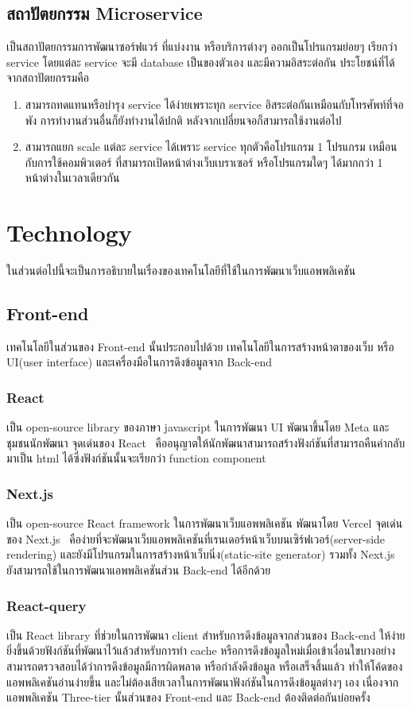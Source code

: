 \subsection{สถาปัตยกรรม Microservice}
เป็นสถาปัตยกรรมการพัฒนาซอร์ฟแวร์ ที่แบ่งงาน หรือบริการต่างๆ ออกเป็นโปรแกรมย่อยๆ
เรียกว่า service โดยแต่ละ service จะมี database เป็นของตัวเอง และมีความอิสระต่อกัน 
ประโยชน์ที่ได้จากสถาปัตยกรรมคือ 
\begin{enumerate}
      \item สามารถทดแทนหรือบำรุง service ได้ง่ายเพราะทุก service อิสระต่อกันเหมือนกับโทรศัพท์ที่จอพัง 
      การทำงานส่วนอื่นก็ยังทำงานได้ปกติ หลังจากเปลี่ยนจอก็สามารถใช้งานต่อไป
      \item สามารถแยก scale แต่ละ service ได้เพราะ service ทุกตัวคือโปรแกรม 1 โปรแกรม เหมือนกับการใช้คอมพิวเตอร์
      ที่สามารถเปิดหน้าต่างเว็บเบราเซอร์ หรือโปรแกรมใดๆ ได้มากกว่า 1 หน้าต่างในเวลาเดียวกัน
\end{enumerate}

\section{Technology}
ในส่วนต่อไปนี้จะเป็นการอธิบายในเรื่องของเทคโนโลยีที่ใช้ในการพัฒนาเว็บแอพพลิเคชัน
\subsection{Front-end}
เทคโนโลยีในส่วนของ Front-end นั้นประกอบไปด้วย
เทคโนโลยีในการสร้างหน้าตาของเว็บ หรือ UI(user interface)
และเครื่องมือในการดึงข้อมูลจาก Back-end
\subsubsection{React}
เป็น open-source library ของภาษา javascript ในการพัฒนา UI พัฒนาขึ้นโดย Meta และชุมชนนักพัฒนา
จุดเด่นของ React~\cite{react-wiki} คืออนุญาตให้นักพัฒนาสามารถสร้างฟังก์ชันที่สามารถคืนค่ากลับมาเป็น html ได้ซึ่งฟังก์ชันนั้นจะเรียกว่า function component
\subsubsection{Next.js}
เป็น open-source React framework ในการพัฒนาเว็บแอพพลิเคชัน พัฒนาโดย Vercel
จุดเด่นของ Next.js~\cite{next-wiki} คือง่ายที่จะพัฒนาเว็บแอพพลิเคชันที่เรนเดอร์หน้าเว็บบนเซิร์ฟเวอร์(server-side rendering) และยังมีโปรแกรมในการสร้างหน้าเว็บนิ่ง(static-site generator)
รวมทั้ง Next.js ยังสามารถใช้ในการพัฒนาแอพพลิเคชันส่วน Back-end ได้อีกด้วย
\subsubsection{React-query}
เป็น React library ที่ช่วยในการพัฒนา client สำหรับการดึงข้อมูลจากส่วนของ Back-end ให้ง่ายยิ่งขึ้นด้วยฟังก์ชันที่พัฒนาไว้แล้วสำหรับการทำ cache 
หรือการดึงข้อมูลใหม่เมื่อเข้าเงื่อนใขบางอย่าง สามารถตรวจสอบได้ว่าการดึงข้อมูลมีการผิดพลาด หรือกำลังดึงข้อมูล หรือเสร็จสิ้นแล้ว ทำให้โค้ดของแอพพลิเคชันอ่านง่ายขึ้น 
และไม่ต้องเสียเวลาในการพัฒนาฟังก์ชันในการดึงข้อมูลต่างๆ เอง เนื่องจากแอพพลิเคชัน Three-tier นั้นส่วนของ Front-end และ Back-end ต้องติดต่อกันบ่อยครั้ง
